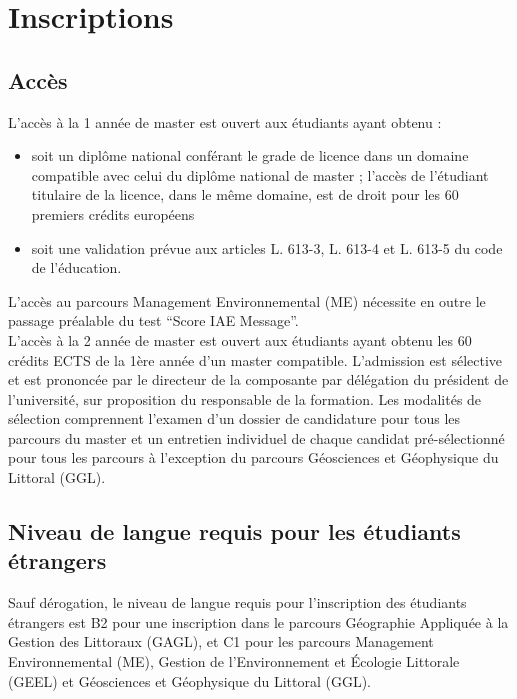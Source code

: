\documentclass[a4paper,11pt]{article}
\begin{document}

\section{Inscriptions}\label{Inscriptions}
\subsection{Accès}\label{Acces}
\setcounter{page}{1}

L'accès à la 1\iere{} année de master est ouvert aux étudiants ayant obtenu :
\begin{itemize} 
\item soit un diplôme national conférant le grade de licence dans un domaine compatible avec celui du diplôme national de master ; l'accès de l'étudiant titulaire de la licence, dans le même domaine, est de droit pour les 60 premiers crédits européens
\item soit une validation prévue aux articles L. 613-3, L. 613-4 et L. 613-5 du code de l'éducation.
\end{itemize}

L'accès au parcours Management Environnemental (ME) nécessite en outre le passage préalable du test ``Score IAE Message''.\\

L'accès à la 2\ieme{} année de master est ouvert aux étudiants ayant obtenu les 60 crédits ECTS de la 1ère année d'un master compatible. L'admission est sélective et est prononcée par le directeur de la composante par délégation du président de l'université, sur proposition du responsable de la formation. Les modalités de sélection comprennent l'examen d'un dossier de candidature pour tous les parcours du master et un entretien individuel de chaque candidat pré-sélectionné pour tous les parcours à l'exception du parcours Géosciences et Géophysique du Littoral (GGL).


\subsection{Niveau de langue requis pour les étudiants étrangers}\label{langue}
Sauf dérogation, le niveau de langue requis pour l'inscription des étudiants étrangers est B2 pour une inscription dans le parcours Géographie Appliquée à la Gestion des Littoraux (GAGL), et C1 pour les parcours Management Environnemental (ME), Gestion de l'Environnement et Écologie Littorale (GEEL) et Géosciences et Géophysique du Littoral (GGL).
\end{document}
